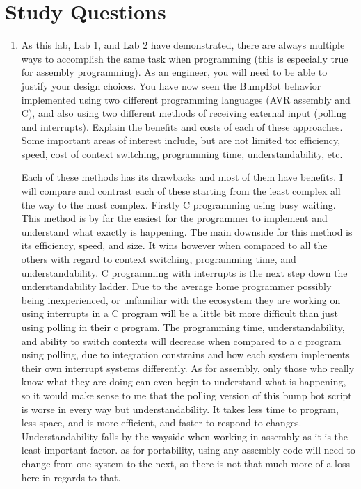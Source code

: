 \documentclass[12pt,letterpaper]{article}
\begin{document}
\section{Study Questions}
\begin{enumerate}
    \item
    As this lab, Lab 1, and Lab 2 have demonstrated, there are always multiple ways to accomplish the same task when programming (this is especially true for assembly programming). As an engineer, you will need to be able to justify your design choices. You have now seen the BumpBot behavior implemented using two different programming languages (AVR assembly and C), and also using two different methods of receiving external input (polling and interrupts).
    Explain the benefits and costs of each of these approaches. Some important areas of interest include, but are not limited to: efficiency, speed, cost of context switching, programming time, understandability, etc.
    
    Each of these methods has its drawbacks and most of them have benefits. I will compare and contrast each of these starting from the least complex all the way to the most complex. Firstly C programming using busy waiting. This method is by far the easiest for the programmer to implement and understand what exactly is happening. The main downside for this method is its efficiency, speed, and size. It wins however when compared to all the others with regard to context switching, programming time, and understandability. 
    C programming with interrupts is the next step down the understandability ladder. Due to the average home programmer possibly being inexperienced, or unfamiliar with the ecosystem they are working on using interrupts in a C program will be a little bit more difficult than just using polling in their c program. The programming time, understandability, and ability to switch contexts will decrease when compared to a c program using polling, due to integration constrains and how each system implements their own interrupt systems differently. 
    As for assembly, only those who really know what they are doing can even begin to understand what is happening, so it would make sense to me that the polling version of this bump bot script is worse in every way but understandability. It takes less time to program, less space, and is more efficient, and faster to respond to changes. Understandability  falls by the wayside when working in assembly as it is the least important factor. as for portability, using any assembly code will need to change from one system to the next, so there is not that much more of a loss here in regards to that.
    

\end{enumerate}
\end{document}
